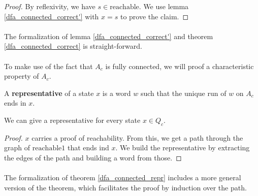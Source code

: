\begin{proof}
    By reflexivity, we have $s \in \mathrm{reachable}$. 
    We use lemma \ref{dfa_connected_correct'} with $x = s$ to prove the claim.
\end{proof}

\paragraph{}
The formalization of lemma \ref{dfa_connected_correct'} and theorem \ref{dfa_connected_correct} is straight-forward.


\paragraph{}
To make use of the fact that $A_c$ is fully connected, we will proof a characteristic property of $A_c$. 

\begin{definition}
    A \textbf{representative} of a state $x$ is a word $w$ such that the unique run of $w$ on $A_c$ ends in $x$.
\end{definition}

\begin{lemma}
    \label{dfa_connected_repr}
    We can give a representative for every state $x \in Q_c$.
\end{lemma}

\begin{proof}
    $x$ carries a proof of reachability.
    From this, we get a path through the graph of $\mathrm{reachable1}$ that ends ind $x$.
    We build the representative by extracting the edges of the path and building a word from those.
\end{proof}

\paragraph{}
The formalization of theorem \ref{dfa_connected_repr} includes a more general version of the theorem, 
which facilitates the proof by induction over the path.



